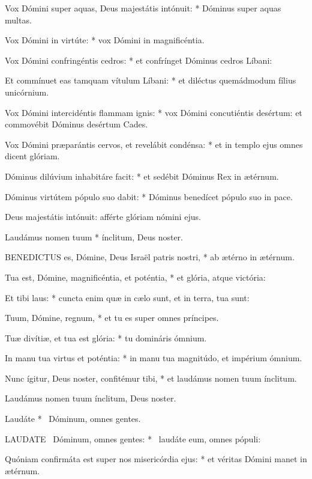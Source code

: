 Vox Dómini super aquas, Deus majestátis intónuit: * Dóminus super aquas multas.

Vox Dómini in virtúte: * vox Dómini in magnificéntia.

Vox Dómini confringéntis cedros: * et confrínget Dóminus cedros Líbani:

Et commínuet eas tamquam vítulum Líbani: * et diléctus quemádmodum fílius unicórnium.

Vox Dómini intercidéntis flammam ignis: * vox Dómini concutiéntis desértum: et commovébit Dóminus desértum Cades.

Vox Dómini præparántis cervos, et revelábit condénsa: * et in templo ejus omnes dicent glóriam.

Dóminus dilúvium inhabitáre facit: * et sedébit Dóminus Rex in ætérnum.

Dóminus virtútem pópulo suo dabit: * Dóminus benedícet pópulo suo in pace.

 Deus majestátis intónuit: afférte glóriam nómini ejus.

 Laudámus nomen tuum * ínclitum, Deus noster.


\lettrine[lines=2]{B}{ENEDICTUS} es, Dómine, Deus Israël patris nostri, * ab ætérno in ætérnum.

Tua est, Dómine, magnificéntia, et poténtia, * et glória, atque victória:

Et tibi laus: * cuncta enim quæ in cælo sunt, et in terra, tua sunt:

Tuum, Dómine, regnum, * et tu es super omnes príncipes.

Tuæ divítiæ, et tua est glória: * tu domináris ómnium.

In manu tua virtus et poténtia: * in manu tua magnitúdo, et impérium ómnium.

Nunc ígitur, Deus noster, confitémur tibi, * et laudámus nomen tuum ínclitum.

 Laudámus nomen tuum ínclitum, Deus noster.

 Laudáte * \textdagger\ Dóminum, omnes gentes. \textdaggerdbl


\lettrine[lines=2]{L}{AUDATE} \textdagger\ Dóminum, omnes gentes: * \textdaggerdbl\ laudáte eum, omnes pópuli:

Quóniam confirmáta est super nos misericórdia ejus: * et véritas Dómini manet in ætérnum.

